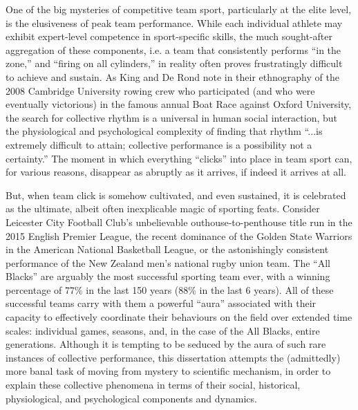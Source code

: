 One of the big mysteries of competitive team sport, particularly at the elite level, is the elusiveness of peak team performance.  While each individual athlete may exhibit expert-level competence in sport-specific skills, the much sought-after aggregation of these components, i.e. a team that consistently performs ``in the zone,'' and ``firing on all cylinders,'' in reality often proves frustratingly difficult to achieve and sustain.  As King and De Rond \textcite[568]{King2011} note in their ethnography of the 2008 Cambridge University rowing crew who participated (and who were eventually victorious) in the famous annual Boat Race against Oxford University, the search for collective rhythm is a universal in human social interaction, but  the physiological and psychological complexity of finding that rhythm ``...is extremely difficult to attain; collective performance is a possibility not a certainty.''   The moment in which everything ``clicks'' into place in team sport can, for various reasons, disappear as abruptly as it arrives, if indeed it arrives at all.

But, when team click is somehow cultivated, and even sustained, it is celebrated as the ultimate, albeit often inexplicable magic of sporting feats. Consider Leicester City Football Club's unbelievable outhouse-to-penthouse title run in the 2015 English Premier League, the recent dominance of the Golden State Warriors in the American National Basketball League, or the astonishingly consistent performance of the New Zealand men's national rugby union team.  The ``All Blacks'' are arguably the most successful sporting team ever, with a winning percentage of 77\% in the last 150 years (88\% in the last 6 years).  All of these successful teams carry with them a powerful ``aura'' associated with their capacity to effectively coordinate their behaviours on the field over extended time scales: individual games, seasons, and, in the case of the All Blacks, entire generations.  Although it is tempting to be seduced by the aura of such rare instances of collective performance, this dissertation attempts the (admittedly) more banal task of moving from mystery to scientific mechanism, in order to explain these collective phenomena in terms of their social, historical, physiological, and psychological components and dynamics.

